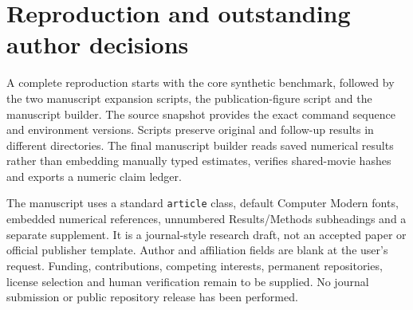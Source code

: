 \documentclass[11pt]{article}
\begin{document}
\clearpage
\section{Reproduction and outstanding author decisions}
A complete reproduction starts with the core synthetic benchmark, followed by the two manuscript expansion scripts, the publication-figure script and the manuscript builder. The source snapshot provides the exact command sequence and environment versions. Scripts preserve original and follow-up results in different directories. The final manuscript builder reads saved numerical results rather than embedding manually typed estimates, verifies shared-movie hashes and exports a numeric claim ledger.

The manuscript uses a standard \texttt{article} class, default Computer Modern fonts, embedded numerical references, unnumbered Results/Methods subheadings and a separate supplement. It is a journal-style research draft, not an accepted paper or official publisher template. Author and affiliation fields are blank at the user's request. Funding, contributions, competing interests, permanent repositories, license selection and human verification remain to be supplied. No journal submission or public repository release has been performed.
\end{document}
